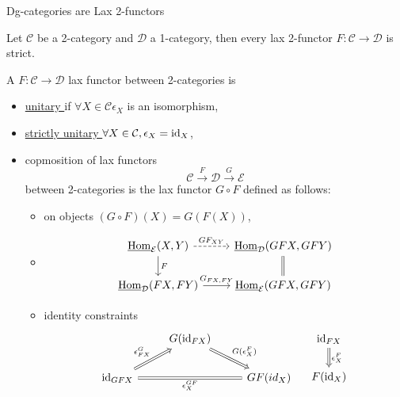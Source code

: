 \begin{rmk}
	Dg-categories are Lax 2-functors
\end{rmk}	

\begin{Exercise}
	Let $ \mathcal{ C } $ be a 2-category and $ \mathcal{ D } $ a 1-category, then every lax 2-functor $ F \colon  \mathcal{ C } \to \mathcal{ D } $ is strict.
\end{Exercise}

\begin{defi}
	A $ F \colon \mathcal{ C } \to \mathcal{ D } $ lax functor between 2-categories is 
	\begin{itemize}
		\item 
		\underline{ unitary } if $  \forall X \in \mathcal{ C } \epsilon_X $ is an isomorphism,
		
		\item 
		\underline{ strictly unitary } $ \forall X \in \mathcal{ C } , \epsilon_X = \operatorname{id}_X $,
		
		\item 
		copmosition of lax functors
		\[
			\mathcal{ C } \xrightarrow{ F } 
			\mathcal{ D } \xrightarrow{ G } 
			\mathcal{ E }
		\]  
		between 2-categories is the lax functor $ G \circ F $ defined as follows:
		
		\begin{itemize}
			\item 
			on objects $( G \circ F ) ( X ) = G ( F ( X ) )$,
			
			\item 
			\[
			\begin{tikzcd}
				\underline{ \Hom }_{ \mathcal{ E } } ( X , Y )
				\ar[r, dashed, "GF_{XY} "]
				\ar[d, " F "]
				&
				\underline{ \Hom }_{ \mathcal{ D } } ( GFX , GFY )
				\ar[d, equal]
				\\
				\underline{ \Hom }_{ \mathcal{ D } } ( FX , FY )
				\ar[r, "G_{ FX , FY }"]
				&
				\underline{\Hom}_{\mathcal{ E } } ( GFX , GFY )   
			\end{tikzcd}
			\]
			
			\item 
			identity constraints
			\[
			\begin{tikzcd}
				&G ( \id_{ FX } )
				\ar[rd, Rightarrow, " G ( \epsilon_X^F) "]
				\\
				\id_{GFX}
				\ar[ru, Rightarrow, " \epsilon_{FX}^G"]
				\ar[rr, Rightarrow, equal, " \epsilon_X^{GF}"']
				&&
				GF ( id_X )
			\end{tikzcd}
			\quad 
			\begin{tikzcd}		
				\id_{FX}
				\ar[d, Rightarrow, "\epsilon_X^F"]
				\\
				F ( \id_X ) 
			\end{tikzcd}
			\]
			

\end{itemize}
\end{itemize}
\end{defi}
